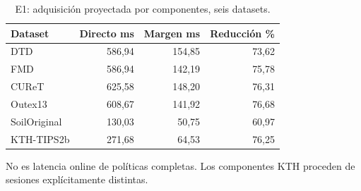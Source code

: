 \begin{table}[!htbp]\centering
\fontsize{8}{10}\selectfont\setlength{\tabcolsep}{4pt}
\caption{E1: adquisición proyectada por componentes, seis datasets.}\label{tab:e1-fixed4-costs}
\begin{tabular}{@{}lrrr@{}}\toprule
Dataset & Directo ms & Margen ms & Reducción \%\\\midrule
DTD & 586,94 & 154,85 & 73,62\\
FMD & 586,94 & 142,19 & 75,78\\
CUReT & 625,58 & 148,20 & 76,31\\
Outex13 & 608,67 & 141,92 & 76,68\\
SoilOriginal & 130,03 & 50,75 & 60,97\\
KTH-TIPS2b & 271,68 & 64,53 & 76,25\\
\bottomrule\end{tabular}
\par\smallskip\begin{minipage}{0.98\textwidth}\footnotesize No es latencia online de políticas completas. Los componentes KTH proceden de sesiones explícitamente distintas.\end{minipage}
\end{table}
